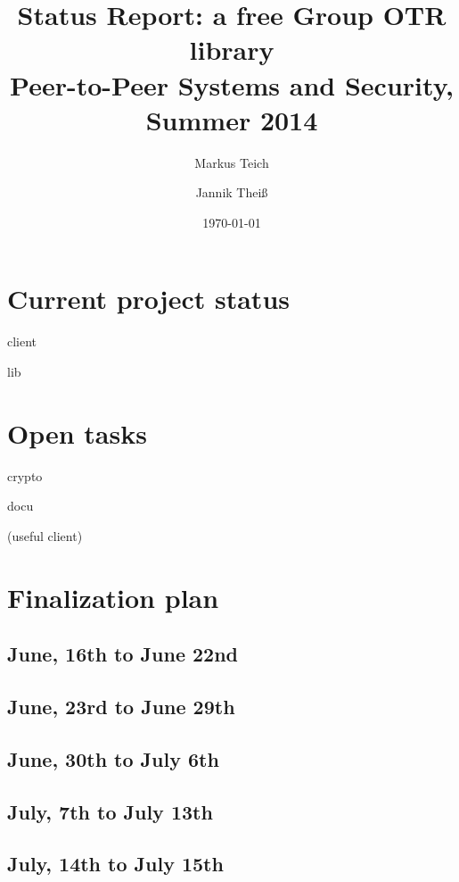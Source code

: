 

\title{Status Report: a free Group OTR library \\ {\small Peer-to-Peer Systems and Security, Summer 2014}}
\author{
	Markus Teich
	\and
	Jannik Theiß
}
\date{\today}



\maketitle


\section{Current project status}

client

lib

\section{Open tasks}

crypto

docu

(useful client)

\section{Finalization plan}

\subsection{June, 16th to June 22nd}

\subsection{June, 23rd to June 29th}

\subsection{June, 30th to July 6th}

\subsection{July, 7th to July 13th}

\subsection{July, 14th to July 15th}


